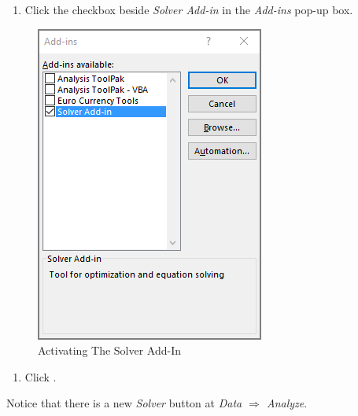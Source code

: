 \begin{enumerate}[resume]	
	
	\item Click the checkbox beside \textit{Solver Add-in} in the \textit{Add-ins} pop-up box.
	
\end{enumerate}

\begin{figure}[H]
	\centering
	\includegraphics[width=\maxwidth{.65\linewidth}]{gfx/ch08_fig72}
	\caption{Activating The Solver Add-In}
	\label{08:fig72}
\end{figure}

\begin{enumerate}[resume]	
	\item Click .
\end{enumerate}

Notice that there is a new \textit{Solver} button at \textit{Data $ \Rightarrow $ Analyze}.

